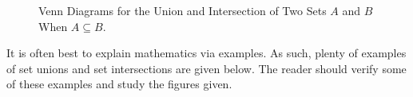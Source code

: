             \begin{figure}[H]
                \captionsetup{type=figure}
                \centering
                \begin{subfigure}[b]{0.49\textwidth}
                    \captionsetup{type=figure}
                    \centering
                    
                    \label{fig:Elem_Alg_Union_of_Subset}
                \end{subfigure}
                \begin{subfigure}[b]{0.49\textwidth}
                    \captionsetup{type=figure}
                    \centering
                    
                    \label{fig:Elem_Alg_Intersection_of_Subset}
                \end{subfigure}
                \caption[More Venn Diagrams]
                        {Venn Diagrams for the
                         Union and Intersection of Two
                         Sets $A$ and $B$ When
                         $A\subseteq{B}$.}
                \label{fig:Elem_Alg_Venn_Diagram_for_Subset}
            \end{figure}
            It is often best to explain mathematics via
            examples. As such, plenty of examples of
            set unions and set intersections are given
            below. The reader should verify some of these
            examples and study the figures given.
